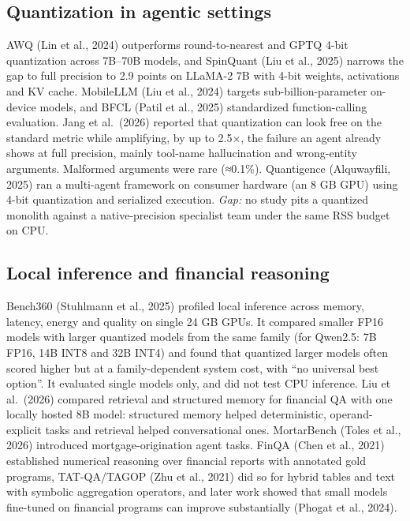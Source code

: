 \documentclass[letterpaper]{article}
\begin{document}
\subsection{Quantization in agentic settings}\label{quantization-in-agentic-settings}

AWQ (Lin et al., 2024) outperforms round-to-nearest and GPTQ 4-bit quantization across 7B--70B models, and SpinQuant (Liu et al., 2025) narrows the gap to full precision to 2.9 points on LLaMA-2 7B with 4-bit weights, activations and KV cache. MobileLLM (Liu et al., 2024) targets sub-billion-parameter on-device models, and BFCL (Patil et al., 2025) standardized function-calling evaluation. Jang et al.~(2026) reported that quantization can look free on the standard metric while amplifying, by up to 2.5×, the failure an agent already shows at full precision, mainly tool-name hallucination and wrong-entity arguments. Malformed arguments were rare (≈0.1\%). Quantigence (Alquwayfili, 2025) ran a multi-agent framework on consumer hardware (an 8 GB GPU) using 4-bit quantization and serialized execution. \emph{Gap:} no study pits a quantized monolith against a native-precision specialist team under the same RSS budget on CPU.

\subsection{Local inference and financial reasoning}\label{local-inference-and-financial-reasoning}

Bench360 (Stuhlmann et al., 2025) profiled local inference across memory, latency, energy and quality on single 24 GB GPUs. It compared smaller FP16 models with larger quantized models from the same family (for Qwen2.5: 7B FP16, 14B INT8 and 32B INT4) and found that quantized larger models often scored higher but at a family-dependent system cost, with ``no universal best option''. It evaluated single models only, and did not test CPU inference. Liu et al.~(2026) compared retrieval and structured memory for financial QA with one locally hosted 8B model: structured memory helped deterministic, operand-explicit tasks and retrieval helped conversational ones. MortarBench (Toles et al., 2026) introduced mortgage-origination agent tasks. FinQA (Chen et al., 2021) established numerical reasoning over financial reports with annotated gold programs, TAT-QA/TAGOP (Zhu et al., 2021) did so for hybrid tables and text with symbolic aggregation operators, and later work showed that small models fine-tuned on financial programs can improve substantially (Phogat et al., 2024).
\end{document}
